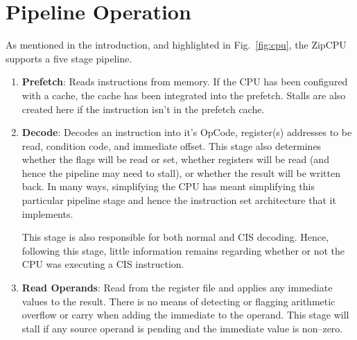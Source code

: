 \documentclass{gqtekspec}
\begin{document}
\section{Pipeline Operation}	%
As mentioned in the introduction, and highlighted in Fig.~\ref{fig:cpu},
the ZipCPU supports a five stage pipeline.
\begin{enumerate}
\item {\bf Prefetch}: Reads instructions from memory.  If the CPU has been 
	configured with a cache, the cache has been integrated into the
	prefetch.  Stalls are also created here if the instruction isn't
	in the prefetch cache.

\item {\bf Decode}: Decodes an instruction into it's OpCode, register(s)
	addresses to be read, condition code, and immediate offset.  This
	stage also determines whether the flags will be read or set, whether
	registers will be read (and hence the pipeline may need to stall), or
	whether the result will be written back.  In many ways, simplifying
	the CPU has meant simplifying this particular pipeline stage and hence
	the instruction set architecture that it implements.

	This stage is also responsible for both normal and CIS decoding.
	Hence, following this stage, little information remains regarding
	whether or not the CPU was executing a CIS instruction.

\item {\bf Read Operands}: Read from the register file and applies any
	immediate values to the result.  There is no means of detecting or
	flagging arithmetic overflow or carry when adding the immediate to the
	operand.  This stage will stall if any source operand is pending
	and the immediate value is non--zero.


\end{enumerate}
\end{document}
